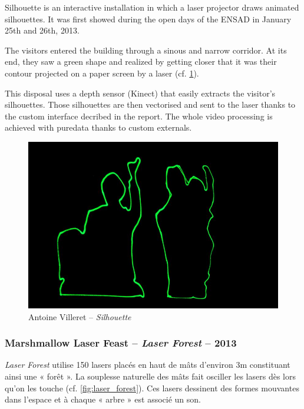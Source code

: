 \begin{en}
Silhouette is an interactive installation in which a laser projector draws animated silhouettes. 
It was first showed during the open days of the ENSAD in January 25th and 26th, 2013.

The visitors entered the building through a sinous and narrow corridor. 
At its end, they saw a green shape and realized by getting closer that it was their contour projected on a paper screen by a laser (cf. \ref{fig:silhouette}).

This disposal uses a depth sensor (Kinect) that easily extracts the visitor’s silhouettes. 
Those silhouettes are then vectorised and sent to the laser thanks to the custom interface decribed in the report. 
The whole video processing is achieved with puredata thanks to custom externals.
\end{en}

\begin{figure}[ht]
\begin{center}
\includegraphics[width=\textwidth]{images/silhouette.jpg} 
\end{center}
\caption{Antoine Villeret -- \textit{Silhouette}}
\label{fig:silhouette}
\end{figure}

\subsubsection{Marshmallow Laser Feast -- \textit{Laser Forest} -- 2013}

\begin{fr} 
\textit{Laser Forest} utilise 150 lasers placés en haut de mâts d'environ 3\unit{m} constituant ainsi une « forêt ». 
La souplesse naturelle des mâts fait osciller les lasers dès lors qu'on les touche (cf. \ref{fig:laser_forest}). 
Ces lasers dessinent des formes mouvantes dans l'espace et à chaque « arbre » est associé un son.
\end{fr}

